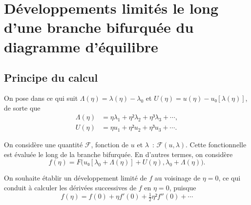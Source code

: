 \documentclass[12pt, final]{amsart}
\begin{document}
\section{Développements limités le long d'une branche bifurquée du diagramme
  d'équilibre}

\subsection{Principe du calcul}

On pose dans ce qui suit \(\Lambda(η)=\lambda(η)-\lambda_0\) et
\(U(η)=u(η)-u₀[\lambda(η)]\), de sorte que
\begin{align}
  \label{eq:20211112155446}
  \Lambda(η)&=η\lambda_1+η²\lambda_2+η³\lambda_3+\cdots,\\
  \label{eq:20211112113028}
  U(η)&=η u_1+η² u_2+η³u_3+\cdots.
\end{align}

On considère une quantité \(\mathcal F\), fonction de \(u\) et \(\lambda\)~:
\(\mathcal F(u, \lambda)\). Cette fonctionnelle est évaluée le long de la
branche bifurquée. En d'autres termes, on considère
\begin{equation}
  f(η)=F\bigl(u₀[\lambda_0+\Lambda(η)]+U(η),
  \lambda_0+\Lambda(η)\bigr).
\end{equation}

On souhaite établir un développement limité de \(f\) au voisinage de
\(η=0\), ce qui conduit à calculer les dérivées successives de \(f\) en
\(η=0\), puisque
\begin{equation}
  f(η)=f(0)+η f'(0)+\tfrac12η²f''(0)+\cdots
\end{equation}
\end{document}
